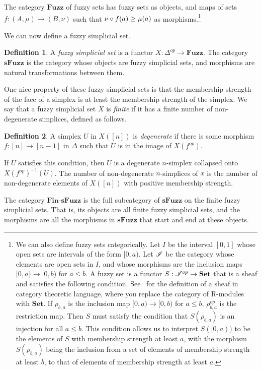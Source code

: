 \documentclass[a4paper,11pt,leqno]{article} \usepackage{amsmath}
\theoremstyle{definition}
\newtheorem{defn}{Definition}
\begin{document}
The category $\textbf{Fuzz}$ of fuzzy sets has fuzzy sets as objects, and maps
of sets $f: (A, \mu)\to (B,\nu)$ such that $\nu\circ f(a) \geq \mu(a)$ as
morphisms.\footnote{
  We can also define fuzzy sets categorically.
  Let $I$ be the interval $[0, 1]$ whose open sets are intervals of the form
  $[0, a)$.
  Let $\mathscr{I}$ be the category whose elements are open sets in $I$, and
  whose morphisms are the inclusion maps $[0, a)\to [0, b)$ for $a\leq b$.
  A fuzzy set is a functor $S: \mathscr{I}^{op}\to \textbf{Set}$ that is a sheaf and
  satisfies the following condition.
  See~\cite{Weng} for the definition of a sheaf in category theoretic language,
  where you replace the category of R-modules with $\textbf{Set}$.
  If $\rho_{b, a}$ is the inclusion map $[0, a)\to [0, b)$ for $a\leq b$,
  $\rho_{b, a}^{op}$ is the restriction map.
  Then $S$ must satisfy the condition that $S(\rho_{b,a})$ is an injection for
  all $a\leq b$.
  This condition allows us to interpret $S([0, a))$ to be the elements of $S$
  with membership strength at least $a$, with the morphism $S(\rho_{b,a})$
  being the inclusion from a set of elements of membership strength at least
  $b$, to that of elements of membership strength at least $a$.
}

We can now define a fuzzy simplicial set.

\begin{defn}
  A \emph{fuzzy simplicial set} is a functor $X: \Delta^{op}\to \textbf{Fuzz}$.
  The category $\textbf{sFuzz}$ is the category whose objects are fuzzy
  simplicial sets, and morphisms are natural transformations between them.
\end{defn}

One nice property of these fuzzy simplicial sets is that the membership
strength of the face of a simplex is at least the membership strength of the
simplex.
We say that a fuzzy simplicial set $X$ is \emph{finite} if it has a finite number
of non-degenerate simplices, defined as follows.
\begin{defn}
  A simplex $U$ in $X([n])$ is \emph{degenerate} if there is some morphism $f:
  [n]\to [n-1]$ in $\Delta$ such that $U$ is in the image of $X(f^{op})$.
\end{defn}
If $U$ satisfies this condition, then $U$ is a degenerate
$n$-simplex collapsed onto $X(f^{op})^{-1}(U)$.
The number of non-degenerate $n$-simplices of $x$ is the number of
non-degenerate elements of $X([n])$ with positive membership strength.

The category $\textbf{Fin-sFuzz}$ is the full subcategory of $\textbf{sFuzz}$
on the finite fuzzy simplicial sets.
That is, its objects are all finite fuzzy simplicial sets, and the morphisms
are all the morphisms in $\textbf{sFuzz}$ that start and end at these objects.
\end{document}
